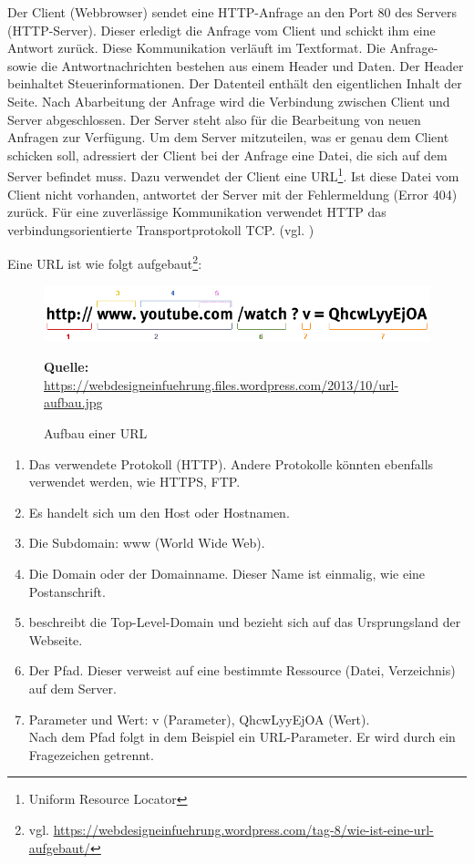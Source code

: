 Der Client (Webbrowser) sendet eine HTTP-Anfrage an den Port 80 des Servers (HTTP-Server). Dieser erledigt die Anfrage vom Client und schickt ihm eine Antwort zurück. Diese Kommunikation verläuft im Textformat. Die Anfrage- sowie die Antwortnachrichten bestehen aus einem Header und Daten. Der Header beinhaltet Steuerinformationen. Der Datenteil enthält den eigentlichen Inhalt der Seite. Nach Abarbeitung der Anfrage wird die Verbindung zwischen Client und Server abgeschlossen. Der Server steht also für die Bearbeitung von neuen Anfragen zur Verfügung. Um dem Server mitzuteilen, was er genau dem Client schicken soll, adressiert der Client bei der Anfrage eine Datei, die sich auf dem Server befindet muss. Dazu verwendet der Client eine URL\footnote{Uniform Resource Locator}. Ist diese Datei vom Client nicht vorhanden, antwortet der Server mit der Fehlermeldung (Error 404) zurück. Für eine zuverlässige Kommunikation verwendet HTTP das verbindungsorientierte Transportprotokoll TCP. (vgl. \cite{Lub2018})

\newpage
Eine URL ist wie folgt aufgebaut\footnote{vgl. \url{https://webdesigneinfuehrung.wordpress.com/tag-8/wie-ist-eine-url-aufgebaut/}}:

\begin{figure}[H]
  \begin{center}
    \includegraphics[scale=0.5]{img/url-aufbau.jpg}
	\caption{Aufbau einer URL}
	\footnotesize\sffamily\textbf{Quelle:} \url{https://webdesigneinfuehrung.files.wordpress.com/2013/10/url-aufbau.jpg} 
	\label{fig:url-aufbau}
  \end{center}   
\end{figure}

\begin{enumerate}
\item Das verwendete Protokoll (HTTP). Andere Protokolle könnten ebenfalls verwendet werden, wie HTTPS, FTP.
\item Es handelt sich um den Host oder Hostnamen.
\item Die Subdomain: www (World Wide Web).
\item Die Domain oder der Domainname. Dieser Name ist einmalig, wie eine Postanschrift.
\item beschreibt die Top-Level-Domain und bezieht sich auf das Ursprungsland der Webseite.
\item Der Pfad. Dieser verweist auf eine bestimmte Ressource (Datei, Verzeichnis) auf dem Server.
\item Parameter und Wert: v (Parameter), QhcwLyyEjOA (Wert).\\
Nach dem Pfad folgt in dem Beispiel ein URL-Parameter. Er wird durch ein Fragezeichen getrennt.
\end{enumerate}

